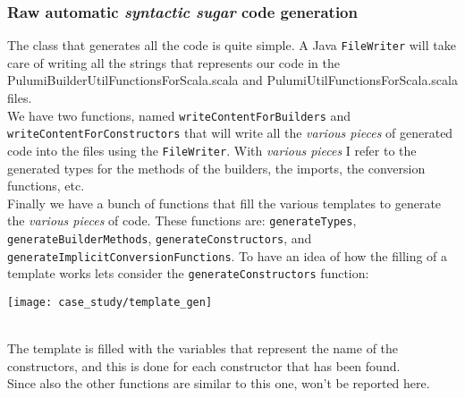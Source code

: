 \subsubsection{Raw automatic \textit{syntactic sugar} code generation}
The class that generates all the code is quite simple.
A Java \texttt{FileWriter} will take care of writing all the strings that represents our code in the PulumiBuilderUtilFunctionsForScala.scala and PulumiUtilFunctionsForScala.scala files.\\
We have two functions, named \texttt{writeContentForBuilders} and \texttt{writeContentForConstructors} that will write all the \textit{various pieces} of generated code into the files using the \texttt{FileWriter}.
With \textit{various pieces} I refer to the generated types for the methods of the builders, the imports, the conversion functions, etc.\\
Finally we have a bunch of functions that fill the various templates to generate the \textit{various pieces} of code.
These functions are: \texttt{generateTypes}, \texttt{generateBuilderMethods}, \texttt{generateConstructors}, and \texttt{generateImplicitConversionFunctions}.
To have an idea of how the filling of a template works lets consider the \texttt{generateConstructors} function:\\
\begin{center}
  \texttt{[image: case\_study/template\_gen]} 
\end{center}\mbox{}\\
The template is filled with the variables that represent the name of the constructors, and this is done for each constructor that has been found.\\
Since also the other functions are similar to this one, won't be reported here.

